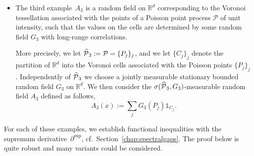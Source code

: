 \documentclass[10pt]{amsart}
\theoremstyle{definition}\newtheorem{defi}[theo]{Definition}\newtheorem{rema}[theo]{Remark}\newtheorem{exam}[theo]{Example}\newtheorem{exem}[theo]{Example}\newtheorem{nota}[theo]{Notation}
\newcommand{\R}{\mathbb R}
\newcommand{\Pc}{\mathcal P}
\newcommand{\parsup}[1]{\partial_{#1}^{\operatorname{\sup}}}
\renewcommand*{\hat}[1]{\mathchoice{\widehat{#1}}{\widehat{#1}}{\oldhat{#1}}{\oldhat{#1}}}\let\oldexists\exists
\renewcommand*{\exists}{\mathrel{\oldexists}}
\begin{document}
\begin{itemize}
\item The third example~$A_3$ is a random field on $\R^d$ corresponding to the Voronoi tessellation associated with the points of a Poisson point process $\Pc$ of unit intensity, such that the values on the cells are determined by some random field $G_3$ with long-range correlations.


More precisely, we let $\hat\Pc_3:=\Pc=\{P_j\}_j$, and we let $\{C_j\}_j$ denote the partition of $\R^d$ into the Voronoi cells associated with the Poisson points $\{P_j\}_j$. Independently of $\hat\Pc_3$ we choose a jointly measurable stationary bounded random field $G_3$ on $\R^d$. We then consider the $\sigma(\hat\Pc_3,G_3)$-measurable random field $A_3$ defined as follows,
\[
A_3(x):=\sum_jG_3(P_j)\mathds1_{C_j}.
\]
\end{itemize}

For each of these examples, we establish functional inequalities with the supremum derivative~$\parsup{}$, cf.~Section~\ref{chap:spectralgaps}. The proof below is quite robust and many variants could be considered.
\end{document}

